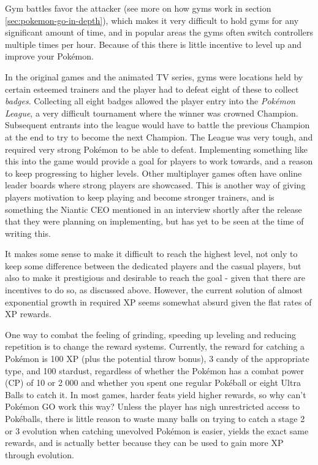 Gym battles favor the attacker (see more on how gyms work in section \ref{sec:pokemon-go-in-depth}), which makes it very difficult to hold gyms for any significant amount of time, and in popular areas the gyms often switch controllers multiple times per hour. Because of this there is little incentive to level up and improve your Pokémon.

In the original games and the animated TV series, gyms were locations held by certain esteemed trainers and the player had to defeat eight of these to collect \emph{badges}. Collecting all eight badges allowed the player entry into the \emph{Pokémon League}, a very difficult tournament where the winner was crowned Champion. Subsequent entrants into the league would have to battle the previous Champion at the end to try to become the next Champion. The League was very tough, and required very strong Pokémon to be able to defeat. Implementing something like this into the game would provide a goal for players to work towards, and a reason to keep progressing to higher levels. Other multiplayer games often have online leader boards where strong players are showcased. This is another way of giving players motivation to keep playing and become stronger trainers, and is something the Niantic CEO mentioned in an interview shortly after the release  that they were planning on implementing, but has yet to be seen at the time of writing this.

It makes some sense to make it difficult to reach the highest level, not only to keep some difference between the dedicated players and the casual players, but also to make it prestigious and desirable to reach the goal - given that there are incentives to do so, as discussed above. However, the current solution of almost exponential growth in required XP seems somewhat absurd  given the flat rates of XP rewards.

One way to combat the feeling of grinding, speeding up leveling and reducing repetition is to change the reward systems. Currently, the reward for catching a Pokémon is 100 XP (plus the potential throw bonus), 3 candy of the appropriate type, and 100 stardust, regardless of whether the Pokémon has a combat power (CP) of 10 or 2 000 and whether you spent one regular Pokéball or eight Ultra Balls to catch it. In most games, harder feats yield higher rewards, so why can't Pokémon GO work this way? Unless the player has nigh unrestricted access to Pokéballs, there is little reason to waste many balls on trying to catch a stage 2 or 3 evolution when catching unevolved Pokémon is easier, yields the exact same rewards, and is actually better because they can be used to gain more XP through evolution.

